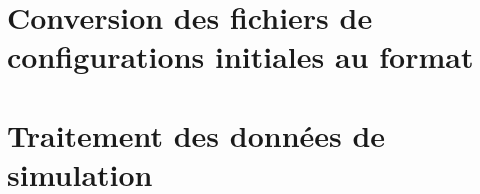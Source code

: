\documentclass[a4paper, 11pt]{article}
\begin{document}
    
\clearpage

\section{Conversion des fichiers de configurations initiales au format \lammps{}} \label{apdx:conversion_lammps}

    
\clearpage

\section{Traitement des données de simulation}

    
\clearpage

\printbibliography
\end{document}
